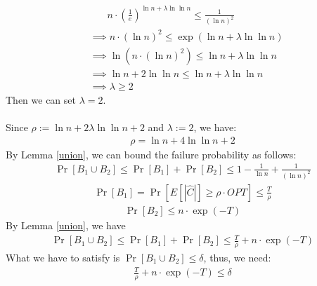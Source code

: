 \begin{align}
  \nonumber &~~~~~~~~n\cdot (\frac{1}{e})^{\ln n + \lambda \ln \ln n} \le \frac{1}{(\ln n)^2}\\
  \nonumber& \implies n\cdot (\ln n)^2 \le \exp({\ln n + \lambda \ln \ln n})\\
  \nonumber& \implies \ln(n\cdot (\ln n)^2)\le \ln n + \lambda \ln \ln n\\
  \nonumber& \implies \ln n +2\ln \ln n \le \ln n + \lambda \ln \ln n\\
   \nonumber& \implies \lambda \ge  2
\end{align}
Then we can set $\lambda=2$.\\
\\
Since $\rho:=\ln n+2\lambda \ln\ln n +2$ and $\lambda := 2$, we have:
\begin{align}
  \nonumber \rho = \ln n +4\ln\ln n +2
\end{align}
By Lemma \ref{union}, we can bound the failure probability as follows:
\begin{align}
  \nonumber \Pr[B_1 \cup B_2]\le \Pr[B_1]+\Pr[B_2]\le 1-\frac{1}{\ln n}+\frac{1}{(\ln n)^2}
\end{align}
\begin{align}
  \nonumber \Pr[B_1]=\Pr[E[|\widehat{C}|]\ge \rho \cdot OPT]\le \frac{T}{\rho}%
\end{align}
\begin{align}
  \nonumber \Pr[B_2]\le n\cdot \exp({-T})
\end{align}
By  Lemma \ref{union}, we have 
\begin{align}
  \nonumber \Pr[B_1 \cup B_2]\le \Pr[B_1]+\Pr[B_2] \le \frac{T}{\rho}+n\cdot \exp({-T})
\end{align}
What we have to satisfy is $\Pr[B_1 \cup B_2]\le \delta$, thus, we need:
\begin{align}
  \nonumber \frac{T}{\rho}+n\cdot \exp({-T}) \le \delta
\end{align}